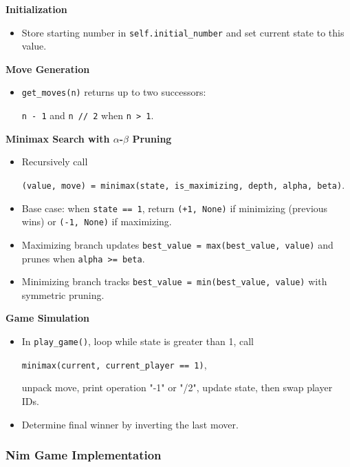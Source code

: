 \documentclass[12pt]{article}
\begin{document}
\vspace{1em}

\noindent\textbf{Initialization}
\begin{itemize}
  \item Store starting number in \texttt{self.initial\_number} and set current state to this value.
\end{itemize}

\noindent\textbf{Move Generation}
\begin{itemize}
  \item \texttt{get\_moves(n)} returns up to two successors: 
  \begin{center}
      \texttt{n - 1} and \texttt{n // 2} when \texttt{n > 1}.
  \end{center}
\end{itemize}

\noindent\textbf{Minimax Search with \(\alpha\)-\(\beta\) Pruning}
\begin{itemize}
  \item Recursively call
    \begin{center}
        \texttt{(value, move) = minimax(state, is\_maximizing, depth, alpha, beta)}.
    \end{center}
  \item Base case: when \texttt{state == 1}, return \texttt{(+1, None)} if minimizing (previous wins) or \texttt{(-1, None)} if maximizing.
  \item Maximizing branch updates \texttt{best\_value = max(best\_value, value)} and prunes when \texttt{alpha >= beta}.
  \item Minimizing branch tracks \texttt{best\_value = min(best\_value, value)} with symmetric pruning.
\end{itemize}

\noindent\textbf{Game Simulation}
\begin{itemize}
  \item In \texttt{play\_game()}, loop while state is greater than 1, call
  \begin{center}
      \texttt{minimax(current, current\_player == 1)},
  \end{center} unpack move, print operation "-1" or "/2", update state, then swap player IDs.
  \item Determine final winner by inverting the last mover.
\end{itemize}

\subsubsection{Nim Game Implementation}
\end{document}
